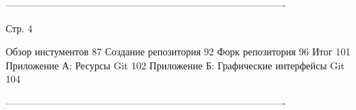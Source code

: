 -------------------------------------------------------------------------------------

Стр. 4

    Обзор инстументов                                                           87
    Создание репозитория                                                        92
    Форк репозитория                                                            96
    Итог                                                                        101
Приложение А: Ресурсы Git                                                       102
Приложение Б: Графические интерфейсы Git                                        104

-------------------------------------------------------------------------------------